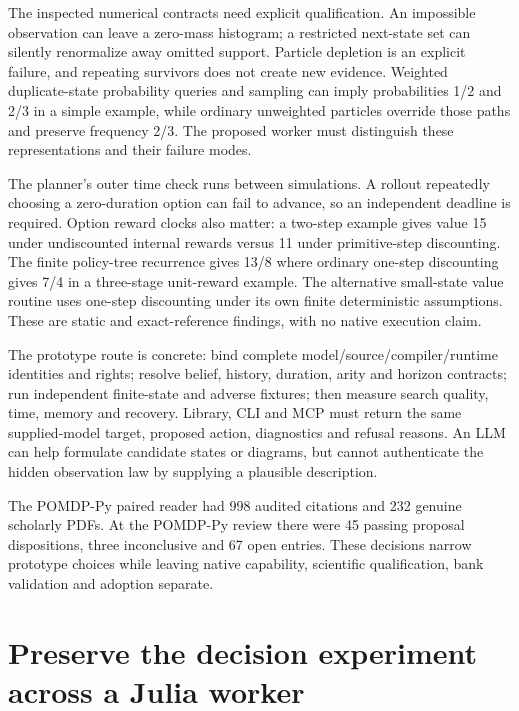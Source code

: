The inspected numerical contracts need explicit qualification. An
impossible observation can leave a zero-mass histogram; a restricted
next-state set can silently renormalize away omitted support. Particle
depletion is an explicit failure, and repeating survivors does not
create new evidence. Weighted duplicate-state probability queries and
sampling can imply probabilities 1/2 and 2/3 in a simple example, while
ordinary unweighted particles override those paths and preserve
frequency 2/3. The proposed worker must distinguish these
representations and their failure modes.
\citep{exec23_pomdppy_sources,exec23_pomdppy_reference}

The planner's outer time check runs between simulations. A rollout
repeatedly choosing a zero-duration option can fail to advance, so an
independent deadline is required. Option reward clocks also matter: a
two-step example gives value 15 under undiscounted internal rewards
versus 11 under primitive-step discounting. The finite policy-tree
recurrence gives 13/8 where ordinary one-step discounting gives 7/4 in a
three-stage unit-reward example. The alternative small-state value
routine uses one-step discounting under its own finite deterministic
assumptions. These are static and exact-reference findings, with no
native execution claim.
\citep{exec23_pomdppy_sources,exec23_pomdppy_reference}

The prototype route is concrete: bind complete
model/source/compiler/runtime identities and rights; resolve belief,
history, duration, arity and horizon contracts; run independent
finite-state and adverse fixtures; then measure search quality, time,
memory and recovery. Library, CLI and MCP must return the same
supplied-model target, proposed action, diagnostics and refusal reasons.
An LLM can help formulate candidate states or diagrams, but cannot
authenticate the hidden observation law by supplying a plausible
description. \citep{exec23_pomdppy_sources}

The POMDP-Py paired reader had 998 audited citations and 232 genuine
scholarly PDFs. At the POMDP-Py review there were 45 passing proposal
dispositions, three inconclusive and 67 open entries. These decisions
narrow prototype choices while leaving native capability, scientific
qualification, bank validation and adoption separate.
\citep{sp23pomdppy_reader,sp23pomdppy_progress}

\hypertarget{preserve-the-decision-experiment-across-a-julia-worker}{%
\section{Preserve the decision experiment across a Julia
worker}\label{preserve-the-decision-experiment-across-a-julia-worker}}


